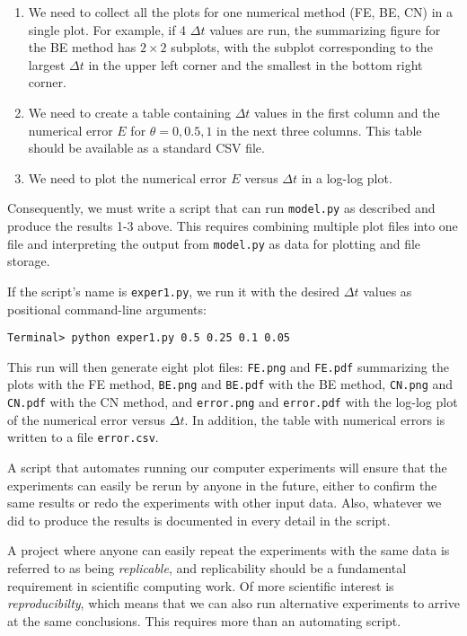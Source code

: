 \documentclass[graybox,sectrefs,envcountresetchap,open=right,final]{svmonodo}
\newenvironment{warning_mdfboxadmon}[1][]{
\begin{warning_mdfboxmdframed}[frametitle=#1]
}
{
\end{warning_mdfboxmdframed}
}
\begin{document}
\begin{enumerate}
\item We need to collect all the plots for one
   numerical method (FE, BE, CN) in a single plot.
   For example, if 4 $\Delta t$ values are run, the summarizing figure
   for the BE method has $2\times 2$ subplots, with the subplot corresponding
   to the largest $\Delta t$ in the upper left corner and the smallest
   in the bottom right corner.

\item We need to create a table containing
   $\Delta t$ values in the first column and the numerical error
   $E$ for $\theta=0,0.5,1$
   in the next three columns. This table should be available as a
   standard CSV file.

\item We need to plot the numerical error $E$ versus $\Delta t$
   in a log-log plot.
\end{enumerate}

\noindent
Consequently, we must write a script that can run \texttt{model.py} as described and
produce the results 1-3 above. This requires combining multiple plot files into
one file and interpreting the output from \texttt{model.py} as data for plotting and
file storage.

If the script's name is \texttt{exper1.py}, we run it with the desired $\Delta t$
values as positional command-line arguments:

\begin{Verbatim}[frame=lines,label=\fbox{{\tiny Terminal}},framesep=2.5mm,framerule=0.7pt,fontsize=\fontsize{9pt}{9pt}]
Terminal> python exper1.py 0.5 0.25 0.1 0.05
\end{Verbatim}
This run will then generate eight plot files: \texttt{FE.png} and \texttt{FE.pdf} summarizing
the plots with the FE method, \texttt{BE.png} and \texttt{BE.pdf} with
the BE method, \texttt{CN.png} and \texttt{CN.pdf} with the CN method, and \texttt{error.png}
and \texttt{error.pdf} with the log-log plot of the numerical error versus $\Delta t$.
In addition, the table with numerical errors is written to a
file \texttt{error.csv}.



\begin{warning_mdfboxadmon}
A script that automates running our computer experiments
will ensure
that the experiments can easily be rerun by anyone in
the future, either to confirm the same results or redo the experiments with
other input data.
Also, whatever we did to produce the results is
documented in every detail in the script.

A project where anyone can easily repeat the experiments with the same data
is referred to as being \emph{replicable}, and replicability
should be a fundamental requirement in scientific computing work.
Of more scientific interest is \emph{reproducibilty}, which means that we can
also run alternative experiments to arrive at the same conclusions.
This requires more than an automating script.
\end{warning_mdfboxadmon}
\end{document}
